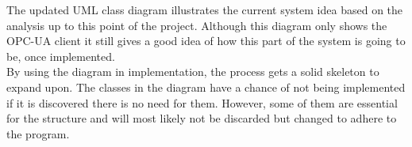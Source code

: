 The updated UML class diagram illustrates the current system idea based on the 
analysis up to this point of the project. Although this diagram only shows the 
OPC-UA client it still gives a good idea of how this part of the system is going
to be, once implemented. \\

By using the diagram in implementation, the process gets a solid skeleton to 
expand upon. The classes in the diagram have a chance of not being implemented 
if it is discovered there is no need for them. However, some of them are 
essential for the structure and will most likely not be discarded but changed to 
adhere to the program.
